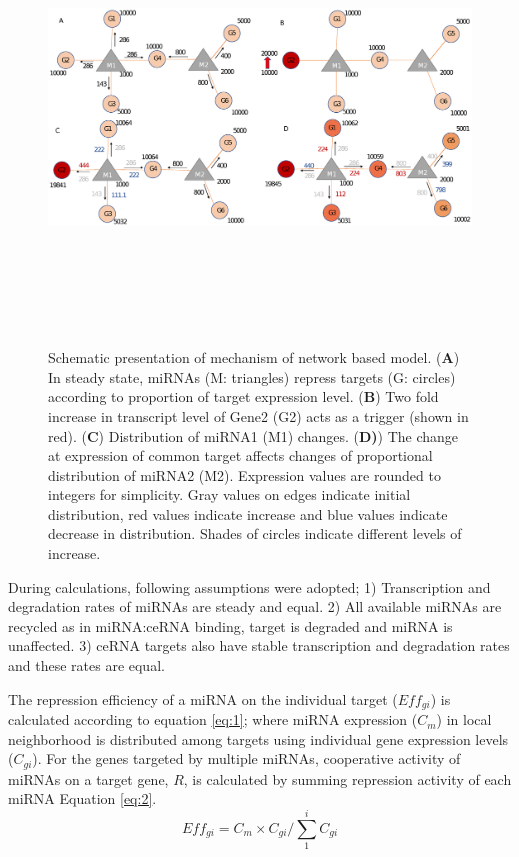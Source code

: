 \documentclass[a4,center,fleqn]{NAR}
\begin{document}
\begin{figure}[ht]
\begin{center}
\includegraphics[width=21cm,height=12cm]{fig1_new.eps}
\end{center}
\caption{Schematic presentation of mechanism of network based model. 
    (\textbf{A}) In steady state, miRNAs (M: triangles) repress targets (G: circles) according to proportion of target expression level. 
    (\textbf{B}) Two fold increase in transcript level of Gene2 (G2) acts as a trigger (shown in red). 
    (\textbf{C}) Distribution of miRNA1 (M1) changes. 
    (\textbf{D)}) The change at expression of common target affects changes of proportional distribution of miRNA2 (M2). Expression values are rounded to integers for simplicity. Gray values on edges indicate initial distribution, red values indicate increase and blue values indicate decrease in distribution. Shades of circles indicate different levels of increase.}
\label{fig:fig1}
\end{figure}

During calculations, following assumptions were adopted; 1)
Transcription and degradation rates of miRNAs are steady and equal. 2)
All available miRNAs are recycled as in miRNA:ceRNA binding, target is
degraded and miRNA is unaffected. 3) ceRNA targets also have stable
transcription and degradation rates and these rates are equal.

The repression efficiency of a miRNA on the individual target
(\(Eff_{gi}\)) is calculated according to equation \eqref{eq:1}; where
miRNA expression (\(C_m\)) in local neighborhood is distributed among
targets using individual gene expression levels (\(C_{gi}\)). For the
genes targeted by multiple miRNAs, cooperative activity of miRNAs on a
target gene, \(R\), is calculated by summing repression activity of each
miRNA Equation \eqref{eq:2}. \begin{equation*} 
    Eff_{gi}= C_m \times C_{gi}/\sum_{1}^{i} C_{gi} \tag{1}\label{eq:1}
\end{equation*}
\end{document}
